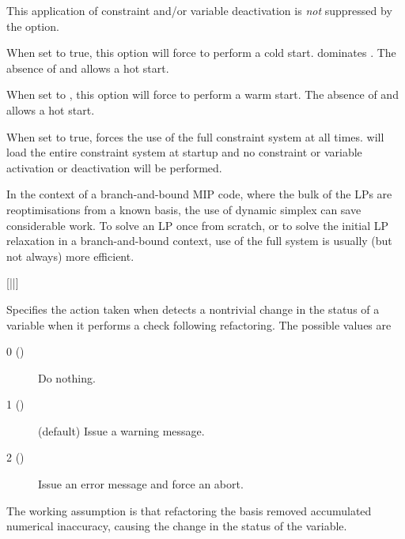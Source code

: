 \begin{codedoc}
  This application of constraint and/or variable deactivation is \textit{not}
  suppressed by the  option.


  \item{}
    \kw{;}

  When set to true, this option will force \dylp to perform a cold
  start.
   dominates .
  The absence of  and  allows a hot start.

  \item{}
    \kw{;}

  When set to , this option will force \dylp to perform a warm
  start.
  The absence of  and  allows a hot start.

  \item{}
    \kw{;}

  When set to true,  forces the use of the full constraint
  system at all times.
  \dylp will load the entire constraint system at startup and no constraint or
  variable activation or deactivation will be performed.

  In the context of a branch-and-bound MIP code, where the bulk of the LPs
  are reoptimisations
  from a known basis, the use of dynamic simplex can save considerable work.
  To solve an LP once from scratch, or to solve the initial LP relaxation in a
  branch-and-bound context, use of the full system is usually (but not always)
  more efficient.

  \item{}
   [||]  \kw{;}

  Specifies the action taken when \dylp detects a nontrivial change in the
  status of a variable when it performs a check following refactoring.
  The possible values are
  \begin{description}
    \item[0 ()] Do nothing.

    \item[1 ()] (default) Issue a warning message.

    \item[2 ()] Issue an error message and force an abort.
  \end{description}

  The working assumption is that refactoring the basis removed accumulated
  numerical inaccuracy, causing the change in the status of the variable.


\end{codedoc}
